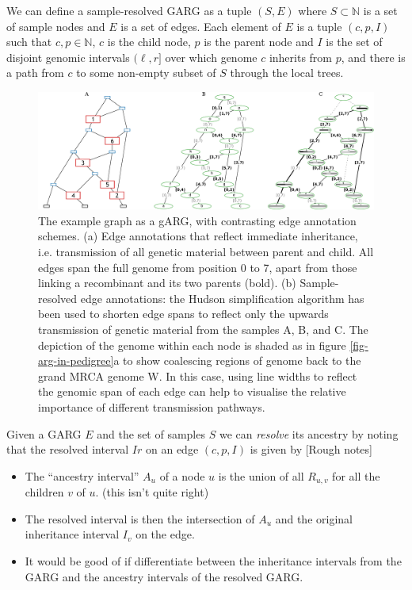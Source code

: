 \documentclass{article}
\begin{document}
We can define a sample-resolved GARG as a tuple $(S, E)$
where $S \subset \mathbb{N}$ is a set of sample nodes and
$E$ is a set of edges. Each element of $E$
is a tuple $(c, p, I)$ such that $c, p \in \mathbb{N}$,
$c$ is the child node, $p$ is the parent node and $I$ is the set of
disjoint genomic intervals $(\ell, r]$
over which genome $c$ inherits from $p$, and there is a path from
$c$ to some non-empty subset of $S$ through the local trees.


\begin{figure}
\centering
\includegraphics[width=\textwidth]{illustrations/ancestry-resolution}
\caption{\label{fig-ancestry-resolution}
The \citet[][fig. 1]{wiuf1999recombination} example graph as a gARG, with contrasting
edge annotation schemes.
(a) Edge annotations that reflect immediate inheritance, i.e. transmission of all
genetic material between parent and child. All edges span the full genome from position 0 to 7,
apart from those linking a recombinant and its two parents (bold).
(b) Sample-resolved edge annotations: the Hudson simplification algorithm has been used to
shorten edge spans to reflect only the upwards transmission of genetic
material from the samples \textsf{A}, \textsf{B}, and \textsf{C}. The depiction of the genome within
each node is shaded as in figure \ref{fig-arg-in-pedigree}a to show
coalescing regions of genome back to the grand MRCA genome \textsf{W}.
In this case, using line widths to reflect the genomic span of each edge can
help to visualise the relative importance of different transmission pathways.
}
\end{figure}

Given a GARG $E$ and the set of samples $S$ we can \emph{resolve} its
ancestry by noting that the resolved interval $Ir$ on an edge $(c,p,I)$
is given by [Rough notes]

\begin{itemize}
\item The ``ancestry interval'' $A_u$ of a node $u$ is the union of
all $R_{u, v}$ for all the children $v$ of $u$. (this isn't quite right)
\item The resolved interval is then the intersection of $A_u$ and the
original inheritance interval $I_v$ on the edge.
\item It would be good of if differentiate between the inheritance intervals
 from the GARG and the ancestry intervals of the resolved GARG.
\end{itemize}
\end{document}
